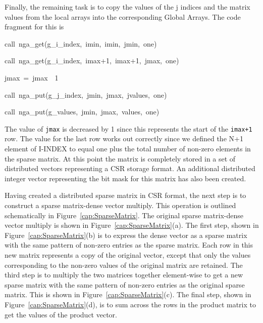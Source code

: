 Finally, the remaining task is to copy the values of the j indices
and the matrix values from the local arrays into the corresponding
Global Arrays. The code fragment for this is
\begin{lyxcode}
call~nga\_get(g\_i\_index,~imin,~imin,~jmin,~one)~

call~nga\_get(g\_i\_index,~imax+1,~imax+1,~jmax,~one)~

jmax~=~jmax~\textendash{}~1~

call~nga\_put(g\_j\_index,~jmin,~jmax,~jvalues,~one)~

call~nga\_put(g\_values,~jmin,~jmax,~values,~one)
\end{lyxcode}
The value of \texttt{jmax} is decreased by 1 since this represents
the start of the \texttt{imax+1} row. The value for the last row works
out correctly since we defined the N+1 element of I-INDEX to equal
one plus the total number of non-zero elements in the sparse matrix.
At this point the matrix is completely stored in a set of distributed
vectors representing a CSR storage format. An additional distributed
integer vector representing the bit mask for this matrix has also
been created.

Having created a distributed sparse matrix in CSR format, the next
step is to construct a sparse matrix-dense vector multiply. This operation
is outlined schematically in Figure~\ref{cap:SparseMatrix}. The
original sparse matrix-dense vector multiply is shown in Figure~\ref{cap:SparseMatrix}(a).
The first step, shown in Figure~\ref{cap:SparseMatrix}(b) is to
express the dense vector as a sparse matrix with the same pattern
of non-zero entries as the sparse matrix. Each row in this new matrix
represents a copy of the original vector, except that only the values
corresponding to the non-zero values of the original matrix are retained.
The third step is to multiply the two matrices together element-wise
to get a new sparse matrix with the same pattern of non-zero entries
as the original sparse matrix. This is shown in Figure~\ref{cap:SparseMatrix}(c).
The final step, shown in Figure~\ref{cap:SparseMatrix}(d), is to
sum across the rows in the product matrix to get the values of the
product vector.

